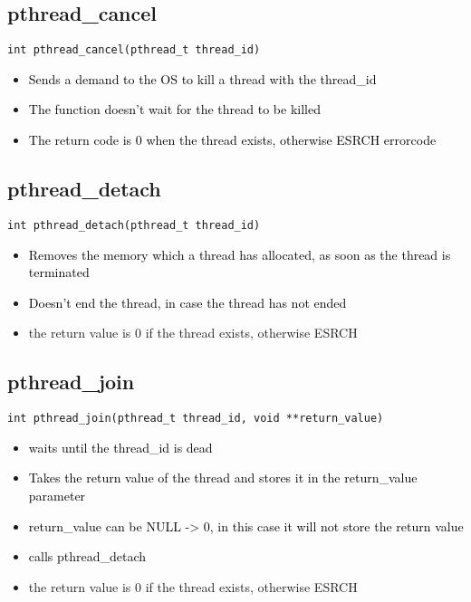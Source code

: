 \documentclass[main.tex,fontsize=8pt,paper=a4,paper=portrait,DIV=calc,]{scrartcl}
\begin{document}
\subsection{pthread\_cancel}
\begin{lstlisting}
int pthread_cancel(pthread_t thread_id)
\end{lstlisting}
\begin{itemize}
\item \textcolor{black}{Sends a demand to the OS to kill a thread with the thread\_id}
\item \textcolor{black}{The function doesn't wait for the thread to be killed}
\item \textcolor{black}{The return code is 0 when the thread exists, otherwise ESRCH errorcode}
\end{itemize} 

\subsection{pthread\_detach}
\begin{lstlisting}
int pthread_detach(pthread_t thread_id)
\end{lstlisting}
\begin{itemize}
\item \textcolor{black}{Removes the memory which a thread has allocated, as soon as the thread is terminated}
\item \textcolor{black}{Doesn't end the thread, in case the thread has not ended}
\item the return value is 0 if the thread exists, otherwise ESRCH
\end{itemize} 

\subsection{pthread\_join}
\begin{lstlisting}
int pthread_join(pthread_t thread_id, void **return_value)
\end{lstlisting}
\begin{itemize}
\item \textcolor{black}{waits until the thread\_id is dead}
\item \textcolor{black}{Takes the return value of the thread and stores it in the return\_value parameter}
\item \textcolor{black}{return\_value can be NULL -> 0, in this case it will not store the return value}
\item \textcolor{black}{calls pthread\_detach}
\item the return value is 0 if the thread exists, otherwise ESRCH
\end{itemize} 
\end{document}
